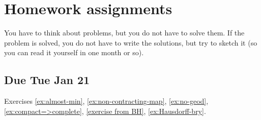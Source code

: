 \addtocounter{chapter}{-1}
\chapter{Homework assignments}

You have to think about problems, but you do not have to solve them.
If the problem is solved, you do not have to write the solutions, but try to sketch it (so you can read it yourself in one month or so).

\section{Due Tue Jan 21}

Exercises \ref{ex:almost-min}, \ref{ex:non-contracting-map}, \ref{ex:no-geod}, \ref{ex:compact=>complete}, \ref{exercise from BH}, \ref{ex:Hausdorff-bry}.
